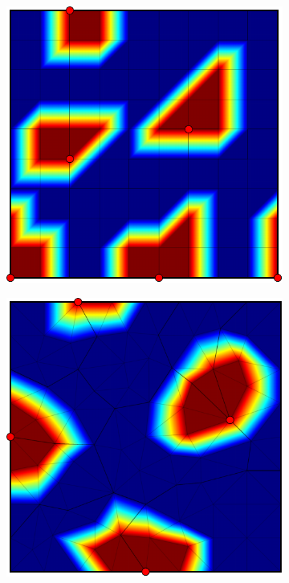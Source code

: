 \begin{figure}[htbp]
\begin{subfigure}[t]{0.3\textwidth}
  \end{subfigure}
  \hfill
  \begin{subfigure}[t]{0.3\textwidth}
    \centerline{\includegraphics[width=0.9\linewidth]{figs/square_cart_metis_node_init}}
  \end{subfigure}
  \hfill
  \begin{subfigure}[t]{0.3\textwidth}
    \centerline{\includegraphics[width=0.9\linewidth]{figs/square_tria_metis_node_init}}

\end{subfigure}
\end{figure}
